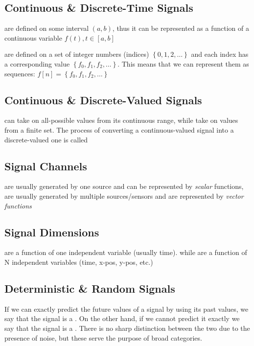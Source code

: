 \subsection*{Continuous \& Discrete-Time Signals}

 are defined on some interval $(a,b)$, thus it can be represented as a function of a continuous variable $f\left( t \right) , t\in\left[ a,b\right]$

 are defined on a set of integer numbers (indices) $\left\{ 0,1,2,\ldots \right\}$ and each index has a corresponding value $\left\{ f_0,f_1,f_2,\ldots \right\}$. This means that we can represent them as sequences: $f\left[ n\right] = \left\{ f_0,f_1,f_2,\ldots \right\}$

\subsection*{Continuous \& Discrete-Valued Signals}

 can take on all-possible values from its continuous range, while
 take on values from a finite set. The process of converting a continuous-valued signal into a discrete-valued one is called 

\subsection*{Signal Channels}
 are usually generated by one source and can be represented by \emph{scalar} functions,  are usually generated by multiple sources/sensors and are represented by \emph{vector functions}

\subsection*{Signal Dimensions}

 are a function of one independent variable (usually time). while  are a function of N independent variables (time, x-pos, y-pos, etc.)

\subsection*{Deterministic \& Random Signals}

If we can exactly predict the future values of a signal by using its past values, we say that the signal is a . On the other hand, if we cannot predict it exactly we say that the signal is a . There is no sharp distinction between the two due to the presence of noise, but these serve the purpose of broad categories.

